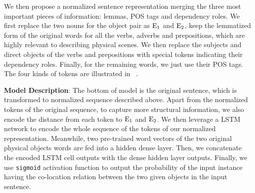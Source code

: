 We then propose a normalized sentence representation merging the three 
most important pieces of information: lemmas, POS tags and dependency roles. 
We first replace the two nouns for the object pair as $\textnormal{E}_1$ and $\textnormal{E}_2$, keep the lemmatized form of the original words for all the verbs, adverbs and prepositions, which are highly relevant to describing physical scenes. 
We then replace the subjects and direct objects of the verbs and prepositions with special tokens indicating their dependency roles. 
Finally, for the remaining words, we just use their POS tags. 
The four kinds of tokens are illustrated in ~.

\noindent
\textbf{Model Description}:
The bottom of model is the original sentence, which is transformed to 
normalized sequence described above.
Apart from the normalized tokens of the original sequence, to capture more structural information, we also encode the distance from each token to $\textnormal E_1$ and $\textnormal E_2$.
We then leverage a LSTM network to encode the 
whole sequence of the tokens of our normalized representation. 
Meanwhile, two pre-trained word vectors of the two original 
physical objects words are fed into a hidden dense layer. 
Then, we concatenate the encoded LSTM cell outputs with the 
dense hidden layer outputs.
Finally, we use \texttt{sigmoid} activation function to output the 
probability of the input instance having the co-location relation 
between the two given objects in the input sentence. 

